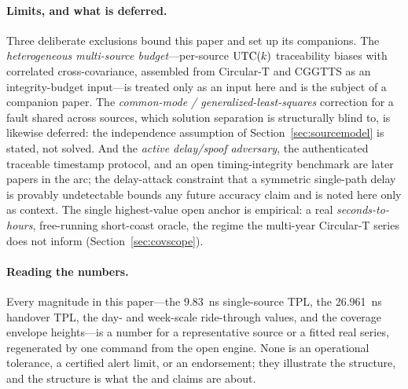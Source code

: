 \paragraph{Limits, and what is deferred.}
Three deliberate exclusions bound this paper and set up its companions. The
\emph{heterogeneous multi-source budget}---per-source $\mathrm{UTC}(k){}$ traceability biases
with correlated cross-covariance, assembled from Circular-T and CGGTTS as an
integrity-budget input---is treated only as an input here and is the subject of a
companion paper. The \emph{common-mode / generalized-least-squares} correction for
a fault shared across sources, which solution separation is structurally blind to,
is likewise deferred: the independence assumption of Section~\ref{sec:sourcemodel}
is stated, not solved. And the \emph{active delay/spoof adversary}, the
authenticated traceable timestamp protocol, and an open timing-integrity benchmark
are later papers in the arc; the delay-attack constraint that a symmetric
single-path delay is provably undetectable \citep{mizrahi7384} bounds any future
accuracy claim and is noted here only as context. The single highest-value open
anchor is empirical: a real \emph{seconds-to-hours}, free-running short-coast
oracle, the regime the multi-year Circular-T series does not inform
(Section~\ref{sec:covscope}).

\paragraph{Reading the numbers.}
Every magnitude in this paper---the \SI{9.83}{\nano\second} single-source TPL, the
\SI{26.961}{\nano\second} handover TPL, the day- and week-scale ride-through
values, and the coverage envelope heights---is a \Modelled{} number for a
representative source or a fitted real series, regenerated by one command from the
open engine. None is an operational tolerance, a certified alert limit, or an
endorsement; they illustrate the structure, and the structure is what the
\Proven{} and \Validated{} claims are about.

